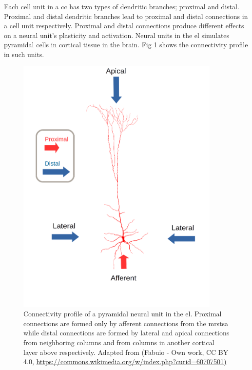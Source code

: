 \documentclass[11pt,a4paper]{article}
\begin{document}
Each cell unit in a \gls{cc} has two types of dendritic branches; proximal and distal.
Proximal and distal dendritic branches lead to proximal and distal connections in a cell unit respectively.
Proximal and distal connections produce different effects on a neural unit's plasticity and activation.
Neural units in the \gls{el} simulates pyramidal cells in cortical tissue in the brain.
Fig \ref{fig:PyramidalCell} shows the connectivity profile in such units. 

\begin{figure}[h!]
    \centering
    \includegraphics[width=0.9\textwidth]{PyramidalCell.png}
    \caption{Connectivity profile of a pyramidal neural unit in the \gls{el}.
    Proximal connections are formed only by afferent connections from the \gls{mrstsa}
    while distal connections are formed by lateral and apical connections from neighboring columns and
    from columns in another cortical layer above respectively.
    Adapted from 
    (Fabuio - Own work, CC BY 4.0, \url{https://commons.wikimedia.org/w/index.php?curid=60707501)}}
    \label{fig:PyramidalCell}
\end{figure}
\end{document}
